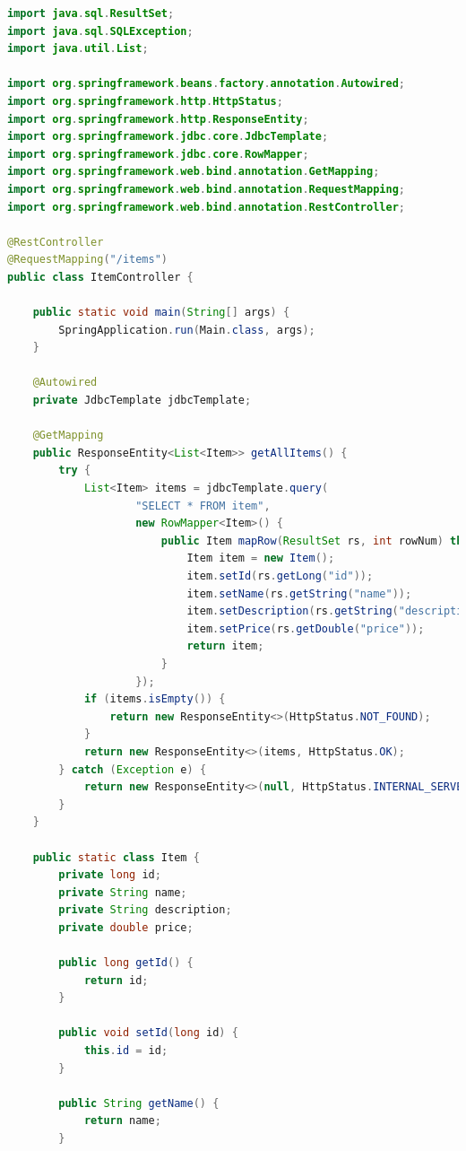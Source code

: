 \documentclass[notitlepage, hidelinks]{article}
\begin{document}
\begin{lstlisting}[language=Java,frame=single,caption=Implementierung in Java,label=toml]
import java.sql.ResultSet;
import java.sql.SQLException;
import java.util.List;

import org.springframework.beans.factory.annotation.Autowired;
import org.springframework.http.HttpStatus;
import org.springframework.http.ResponseEntity;
import org.springframework.jdbc.core.JdbcTemplate;
import org.springframework.jdbc.core.RowMapper;
import org.springframework.web.bind.annotation.GetMapping;
import org.springframework.web.bind.annotation.RequestMapping;
import org.springframework.web.bind.annotation.RestController;

@RestController
@RequestMapping("/items")
public class ItemController {

    public static void main(String[] args) {
        SpringApplication.run(Main.class, args); 
    }

    @Autowired
    private JdbcTemplate jdbcTemplate;

    @GetMapping
    public ResponseEntity<List<Item>> getAllItems() {
        try {
            List<Item> items = jdbcTemplate.query(
                    "SELECT * FROM item",
                    new RowMapper<Item>() {
                        public Item mapRow(ResultSet rs, int rowNum) throws SQLException {
                            Item item = new Item();
                            item.setId(rs.getLong("id"));
                            item.setName(rs.getString("name"));
                            item.setDescription(rs.getString("description"));
                            item.setPrice(rs.getDouble("price"));
                            return item;
                        }
                    });
            if (items.isEmpty()) {
                return new ResponseEntity<>(HttpStatus.NOT_FOUND);
            }
            return new ResponseEntity<>(items, HttpStatus.OK);
        } catch (Exception e) {
            return new ResponseEntity<>(null, HttpStatus.INTERNAL_SERVER_ERROR);
        }
    }

    public static class Item {
        private long id;
        private String name;
        private String description;
        private double price;

        public long getId() {
            return id;
        }

        public void setId(long id) {
            this.id = id;
        }

        public String getName() {
            return name;
        }


\end{lstlisting}
\end{document}
